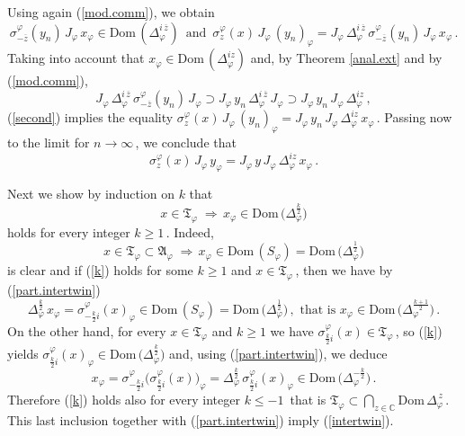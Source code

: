 \documentclass[reqno]{amsart}
\theoremstyle{definition}
\theoremstyle{remark}
\numberwithin{equation}{section}
\theoremstyle{plain}
\begin{document}
Using again (\ref{mod.comm}), we obtain
\begin{equation}\label{second}
\sigma^\varphi_{-\overline{z}} (y_n)\, J_\varphi\, x_\varphi
\in\text{Dom}\, (\Delta_\varphi^{i\,\overline{z}})\,\text{ and }\,
\sigma^\varphi_z (x)\, J_\varphi\, (y_n)_\varphi =J_\varphi\,
\Delta_\varphi^{i\,\overline{z}}\,\sigma^\varphi_{-\overline{z}}
(y_n)\, J_\varphi\, x_\varphi\, .
\end{equation}
Taking into account that $x_\varphi\in\text{Dom}\,
(\Delta_\varphi^{i z})$ and, by Theorem \ref{anal.ext} and by
(\ref{mod.comm}),
\begin{equation*}
J_\varphi\,\Delta_\varphi^{i\,\overline{z}}\,
\sigma^\varphi_{-\overline{z}} (y_n)\, J_\varphi\supset J_\varphi\,
y_n\,\Delta_\varphi^{i\,\overline{z}}\, J_\varphi\supset J_\varphi\,
y_n\, J_\varphi\,\Delta_\varphi^{i z}\, ,
\end{equation*}
(\ref{second}) implies the equality $\sigma^\varphi_z (x)\,
J_\varphi\, (y_n)_\varphi =J_\varphi\, y_n\, J_\varphi\,
\Delta_\varphi^{i z}\, x_\varphi\,$. Passing now to the limit for
$n\to\infty\,$, we conclude that
\begin{equation*}
\sigma^\varphi_z (x)\, J_\varphi\, y_\varphi =J_\varphi\, y\,
J_\varphi\,\Delta_\varphi^{i z}\, x_\varphi\, .
\end{equation*}

Next we show by induction on $k$ that
\begin{equation}\label{k}
x\in\mathfrak T_\varphi\;\Longrightarrow\, x_\varphi\in\text{Dom}\,
\big(\Delta_\varphi^{\frac k2}\big)
\end{equation}
holds for every integer $k\geq 1\,$. Indeed,
\begin{equation*}
x\in\mathfrak T_\varphi\subset\mathfrak A_\varphi\;\Longrightarrow\,
x_\varphi\in\text{Dom}\, (S_\varphi ) =\text{Dom}\,\big(
\Delta_\varphi^{\frac 12}\big)
\end{equation*}
is clear and if (\ref{k}) holds for some $k\geq 1$ and $x\in
\mathfrak T_\varphi\,$, then we have by (\ref{part.intertwin})
\begin{equation*}
\Delta_\varphi^{\frac k2}\, x_\varphi =\sigma^\varphi_{-\frac k2 i}
(x)_\varphi\in\text{Dom}\, (S_\varphi ) =\text{Dom}\,\big(
\Delta_\varphi^{\frac 12}\big)\, ,\text{ that is } x_\varphi\in
\text{Dom}\,\big(\Delta_\varphi^{\frac{k+1}2}\big)\, .
\end{equation*}
On the other hand, for every $x\in\mathfrak T_\varphi$ and $k\geq 1$
we have $\sigma^\varphi_{\frac k2 i}(x)\in\mathfrak T_\varphi\,$, so
(\ref{k}) yields $\sigma^\varphi_{\frac k2 i}(x)_\varphi\in
\text{Dom}\,\big(\Delta_\varphi^{\frac k2}\big)$ and, using
(\ref{part.intertwin}), we deduce
\begin{equation*}
x_\varphi =\sigma^\varphi_{-\frac k2 i}\big(
\sigma^\varphi_{\frac k2 i}(x)\big)_\varphi =\Delta_\varphi^{\frac k2}
\,\sigma^\varphi_{\frac k2 i}(x)_\varphi\in\text{Dom}\,\big(
\Delta_\varphi^{-\frac k2}\big)\, .
\end{equation*}
Therefore (\ref{k}) holds also for every integer $k\leq -1\,$ that is
$\displaystyle \mathfrak T_\varphi\subset\bigcap_{z\in\mathbb C}
\text{Dom}\,\Delta_\varphi^{\, z}\,$.
This last inclusion together with (\ref{part.intertwin}) imply
(\ref{intertwin}).
\end{document}
